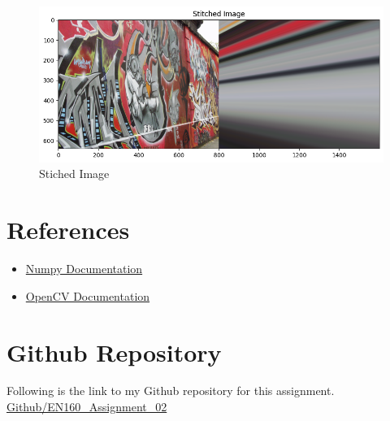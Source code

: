 \documentclass[11pt,a4paper]{article}
\begin{document}
{\begin{figure}[h]
    \centering
    \includegraphics[width=1.0\linewidth]{images/54.png}
    \caption{Stiched Image}
\end{figure}}


\section{References}

\begin{itemize}
    \item \href{https://numpy.org/doc/}{Numpy Documentation}
    \item \href{https://docs.opencv.org/4.x/}{OpenCV Documentation}
   
\end{itemize}

\section{Github Repository}

Following is the link to my Github repository for this assignment.\\

\href{https://github.com/Vgr20/EN_3160_Assignment_02.git}{Github/EN160\_Assignment\_02}


% 
\end{document}
